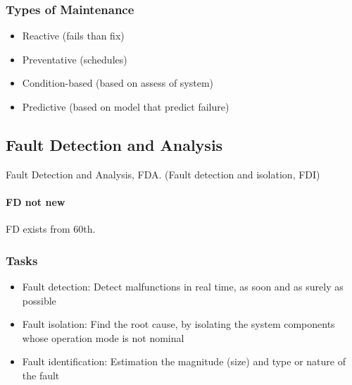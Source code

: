 \documentclass[class=article, crop=false]{standalone}
\begin{document}
\subsubsection{Types of Maintenance}
\begin{itemize}
    \item{Reactive (fails than fix)}
    \item{Preventative (schedules)}
    \item{Condition-based (based on assess of system)}
    \item{Predictive (based on model that predict failure)}
\end{itemize}





% 

\subsection{Fault Detection and Analysis}
Fault Detection and Analysis, FDA. (Fault detection and isolation, FDI) 

\paragraph{FD not new}
FD exists from 60th.

\subsubsection{Tasks}

\begin{itemize}
    \item{Fault detection: Detect malfunctions in real time, as soon and as
        surely as possible}
    \item{Fault isolation: Find the root cause, by isolating the system
        components whose operation mode is not nominal}
    \item{Fault identification: Estimation the magnitude (size) and type or
            nature of the fault}
\end{itemize}

\end{document}
